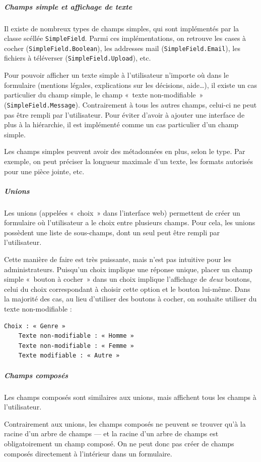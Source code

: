 \subparagraph{Champs simple et affichage de texte}
Il existe de nombreux types de champs simples, qui sont implémentés par la classe scéllée \lstinline{SimpleField}.
Parmi ces implémentations, on retrouve les cases à cocher (\lstinline{SimpleField.Boolean}), les addresses mail (\lstinline{SimpleField.Email}), les fichiers à téléverser (\lstinline{SimpleField.Upload}), etc.

Pour pouvoir afficher un texte simple à l'utilisateur n'importe où dans le formulaire (mentions légales, explications sur les décisions, aide…), il existe un cas particulier du champ simple, le champ «~texte non-modifiable~» (\lstinline{SimpleField.Message}).
Contrairement à tous les autres champs, celui-ci ne peut pas être rempli par l'utilisateur.
Pour éviter d'avoir à ajouter une interface de plus à la hiérarchie, il est implémenté comme un cas particulier d'un champ simple.

Les champs simples peuvent avoir des métadonnées en plus, selon le type.
Par exemple, on peut préciser la longueur maximale d'un texte, les formats autorisés pour une pièce jointe, etc.

\subparagraph{Unions}
Les unions (appelées «~choix~» dans l'interface web) permettent de créer un formulaire où l'utilisateur a le choix entre plusieurs champs.
Pour cela, les unions possèdent une liste de sous-champs, dont un seul peut être rempli par l'utilisateur.

Cette manière de faire est très puissante, mais n'est pas intuitive pour les administrateurs.
Puisqu'un choix implique une réponse unique, placer un champ simple «~bouton à cocher~» dans un choix implique l'affichage de \emph{deux} boutons, celui du choix correspondant à choisir cette option et le bouton lui-même.
Dans la majorité des cas, au lieu d'utiliser des boutons à cocher, on souhaite utiliser du texte non-modifiable :
\begin{lstlisting}[label={lst:lstlisting}]
Choix : « Genre »
	Texte non-modifiable : « Homme »
	Texte non-modifiable : « Femme »
	Texte modifiable : « Autre »
\end{lstlisting}

\subparagraph{Champs composés}
Les champs composés sont similaires aux unions, mais affichent tous les champs à l'utilisateur.

Contrairement aux unions, les champs composés ne peuvent se trouver qu'à la racine d'un arbre de champs --- et la racine d'un arbre de champs est obligatoirement un champ composé.
On ne peut donc pas créer de champs composés directement à l'intérieur dans un formulaire.

